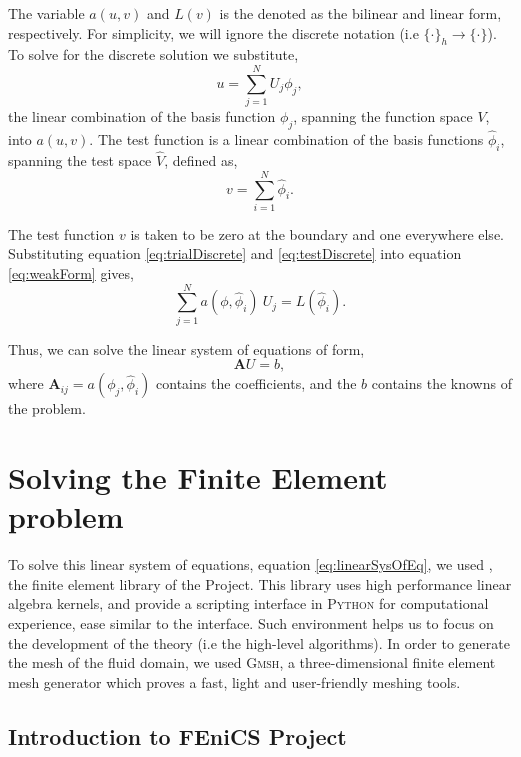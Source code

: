 The variable $a(u,v)$ and $L(v)$ is the denoted as the bilinear and linear form, respectively. For simplicity, we will ignore the discrete notation (i.e $\{\cdot\}_h \rightarrow \{\cdot\}$). To solve for the discrete solution we substitute,	
	\begin{equation}
	u = \sum_{j=1}^{N} U_j \phi_j,
	\label{eq:trialDiscrete}
	\end{equation}
the linear combination of the basis function $\phi_j$, spanning the function space $V$, into $a\left(u,v\right)$. The test function is a linear combination of the basis functions $\hat{\phi}_i$, spanning the test space $\hat{V}$, defined as,
	\begin{equation}
	v=\sum_{i=1}^{N} \hat{\phi}_i.
	\label{eq:testDiscrete}
	\end{equation}
	
The test function $v$ is taken to be zero at the boundary and one everywhere else. Substituting equation \ref{eq:trialDiscrete} and \ref{eq:testDiscrete} into equation \ref{eq:weakForm} gives,
	\begin{equation}
	\sum_{j=1}^N a(\phi,\hat{\phi}_i)\ U_j = L(\hat{\phi}_i).
	\end{equation}

Thus, we can solve the linear system of equations of form,
	\begin{equation}
	\mathbf{A}U = b,
	\label{eq:linearSysOfEq}
	\end{equation}	
where $\mathbf{A}_{ij} = a(\phi_j,\hat{\phi}_i)$ contains the coefficients, and the  $b$ contains the knowns of the problem.
 	
\section{Solving the Finite Element problem}

To solve this linear system of equations, equation \ref{eq:linearSysOfEq}, we used \dolfin, the finite element library of the \fenics Project. This library uses high performance linear algebra kernels, and provide a scripting interface in \textsc{Python} for computational experience, ease similar to the \matlab interface. Such environment helps us to focus on the development of the theory (i.e the high-level algorithms). In order to generate the mesh of the fluid domain, we used \textsc{Gmsh}, a three-dimensional finite element mesh generator which proves a fast, light and user-friendly meshing tools.

\subsection{Introduction to FEniCS Project}

